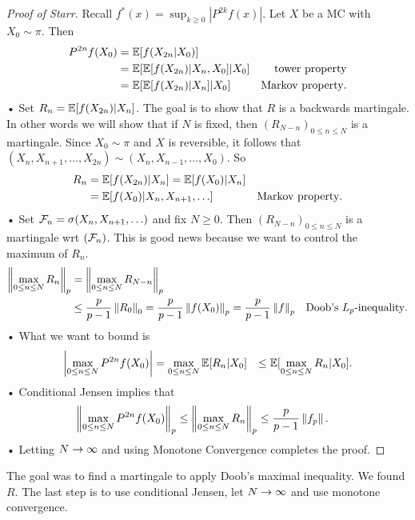 \begin{proof}[Proof of Starr]
Recall $f^*(x) = \sup_{k\ge 0}|P^{2k}f(x)|$. Let $X$ be a MC with $X_0\sim \pi$. Then 
\begin{align*}
P^{2n} f(X_0) &= \mathbb{E}[f(X_{2n}|X_0)] \\
&= \mathbb{E}[\mathbb{E}[f(X_{2n})|X_n,X_0]|X_0] &\text{tower property}\\
&= \mathbb{E}[\mathbb{E}[f(X_{2n})|X_n]|X_0] &\text{Markov property}.
\end{align*}•
Set $R_n=\mathbb{E}[f(X_{2n})|X_n]$. The goal is to show that $R$ is a backwards martingale. In other words we will show that if $N$ is fixed, then $(R_{N-n})_{0\le n\le N}$ is a martingale. 
Since $X_0\sim \pi$ and $X$ is reversible, it follows that $(X_n,X_{n+1},\ldots, X_{2n}) \sim (X_n,X_{n-1},\ldots, X_0)$. So 
\begin{align*}
R_n &= \mathbb{E}[f(X_{2n})|X_n] = \mathbb{E}[f(X_0)|X_n]\\
&= \mathbb{E}[f(X_0)|X_n,X_{n+1},\ldots]&\text{Markov property}.
\end{align*}•
Set $\mathcal{F}_n=\sigma(X_n,X_{n+1},\ldots)$ and fix $N\ge 0$. Then $(R_{N-n})_{0\le n\le N}$ is a martingale wrt $(\mathcal{F}_n)$.
This is good news because we want to control the maximum of $R_n$.
\begin{align*}
\left\Vert {\max_{0\le n\le N}R_n}\right\Vert_p
&=\left\Vert {\max_{0\le n\le N} R_{N-n}}\right\Vert_p\\
&\le \frac{p}{p-1} \left\Vert {R_0}\right\Vert_0 = \frac{p}{p-1}\left\Vert {f(X_0)}\right\Vert_p = \frac{p}{p-1}\left\Vert {f}\right\Vert_p &\text{Doob's $L_p$-inequality}.
\end{align*}•
What we want to bound is
\begin{align*}
\left| {\max_{0\le n\le N} P^{2n}f(X_0)} \right| &= \max_{0\le n\le N} \mathbb{E} [R_n|X_0] &\le \mathbb{E}[\max_{0\le n\le N} R_n|X_0].
\end{align*}•
Conditional Jensen implies that
\begin{align*}
\left\Vert {\max_{0\le n\le N} P^{2n}f(X_0)}\right\Vert_p &\le \left\Vert {\max_{0\le n\le N}R_n}\right\Vert_p
\le \frac{p}{p-1}\left\Vert {f_p}\right\Vert.
\end{align*}•
Letting $N\to \infty$ and using Monotone Convergence completes the proof.
\end{proof}
The goal was to find a martingale to apply Doob's maximal inequality. We found $R$. The last step is to use conditional Jensen, let $N\to \infty$ and use monotone convergence. %

